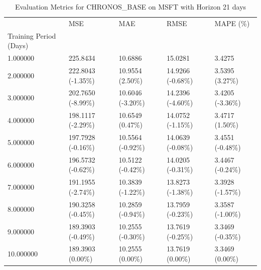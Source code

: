 \begin{table}
\caption{Evaluation Metrics for CHRONOS_BASE on MSFT with Horizon 21 days}
\label{tab:chronos_base_MSFT_h21_metrics}
\begin{tabular}{lllll}
\toprule
 & MSE & MAE & RMSE & MAPE (\%) \\
Training Period (Days) &  &  &  &  \\
\midrule
1.000000 & 225.8434 & 10.6886 & 15.0281 & 3.4275 \\
2.000000 & 222.8043 (-1.35\%) & 10.9554 (2.50\%) & 14.9266 (-0.68\%) & 3.5395 (3.27\%) \\
3.000000 & 202.7650 (-8.99\%) & 10.6046 (-3.20\%) & 14.2396 (-4.60\%) & 3.4205 (-3.36\%) \\
4.000000 & 198.1117 (-2.29\%) & 10.6549 (0.47\%) & 14.0752 (-1.15\%) & 3.4717 (1.50\%) \\
5.000000 & 197.7928 (-0.16\%) & 10.5564 (-0.92\%) & 14.0639 (-0.08\%) & 3.4551 (-0.48\%) \\
6.000000 & 196.5732 (-0.62\%) & 10.5122 (-0.42\%) & 14.0205 (-0.31\%) & 3.4467 (-0.24\%) \\
7.000000 & 191.1955 (-2.74\%) & 10.3839 (-1.22\%) & 13.8273 (-1.38\%) & 3.3928 (-1.57\%) \\
8.000000 & 190.3258 (-0.45\%) & 10.2859 (-0.94\%) & 13.7959 (-0.23\%) & 3.3587 (-1.00\%) \\
9.000000 & 189.3903 (-0.49\%) & 10.2555 (-0.30\%) & 13.7619 (-0.25\%) & 3.3469 (-0.35\%) \\
10.000000 & 189.3903 (0.00\%) & 10.2555 (0.00\%) & 13.7619 (0.00\%) & 3.3469 (0.00\%) \\
\bottomrule
\end{tabular}
\end{table}
